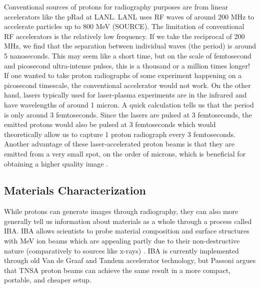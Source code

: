 Conventional sources of protons for radiography purposes are from linear accelerators like the pRad at \gls{LANL}. \gls{LANL} uses \gls{RF} waves of around 200 MHz to accelerate particles up to 800 MeV (SOURCE). The limitation of conventional \gls{RF} accelerators is the relatively low frequency. If we take the reciprocal of 200 MHz, we find that the separation between individual waves (the period) is around 5 nanoseconds. This may seem like a short time, but on the scale of femtosecond and picosecond ultra-intense pulses, this is a thousand or a million times longer! If one wanted to take proton radiographs of some experiment happening on a picosecond timescale, the conventional accelerator would not work. On the other hand, lasers typically used for laser-plasma experiments are in the infrared and have wavelengths of around 1 micron. A quick calculation tells us that the period is only around 3 femtoseconds. Since the lasers are pulsed at 3 femtoseconds, the emitted protons would also be pulsed at 3 femtoseconds which would theoretically allow us to capture 1 proton radiograph every 3 femtoseconds. Another advantage of these laser-accelerated proton beams is that they are emitted from a very small spot, on the order of microns, which is beneficial for obtaining a higher quality image \cite{Schaeffer_2023_RevMod}.

\subsection{Materials Characterization}

While protons can generate images through radiography, they can also more generally tell us information about materials as a whole through a process called \gls{IBA}. \gls{IBA} allows scientists to probe material composition and surface structures with MeV ion beams which are appealing partly due to their non-destructive nature (comparatively to sources like x-rays) \cite{Passoni_2019_SciRep}. \gls{IBA} is currently implemented through old Van de Graaf and Tandem accelerator technology, but Passoni \cite{Passoni_2019_SciRep} argues that \gls{TNSA} proton beams can achieve the same result in a more compact, portable, and cheaper setup.

